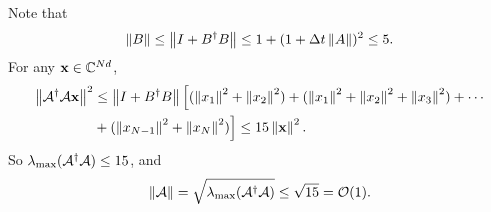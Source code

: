 Note that
\begin{equation}
\norm{B}\le \norm{I+B^{\dag}B}\le 1+(1+\Delta t \norm{A})^2\le 5.
\end{equation}
For any $\vx\in\CC^{Nd}$, 
\begin{equation}
\begin{split}
\norm{\mc{A}^{\dag}\mc{A}\vx}^2 &\le \norm{I+B^{\dag}B}\Big[(\norm{x_1}^2+\norm{x_2}^2)+(\norm{x_1}^2+\norm{x_2}^2+\norm{x_3}^2)+
\cdots\\
&+(\norm{x_{N-1}}^2+\norm{x_{N}}^2) \Big]\le 15\norm{\vx}^2.
\end{split}
\end{equation}
So $\lambda_{\max}(\mc{A}^{\dag}\mc{A})\le 15$, and 
\begin{equation}
\norm{\mc{A}}=\sqrt{\lambda_{\max}(\mc{A}^{\dag}\mc{A})}\le\sqrt{15}=\Or(1).
\end{equation}


